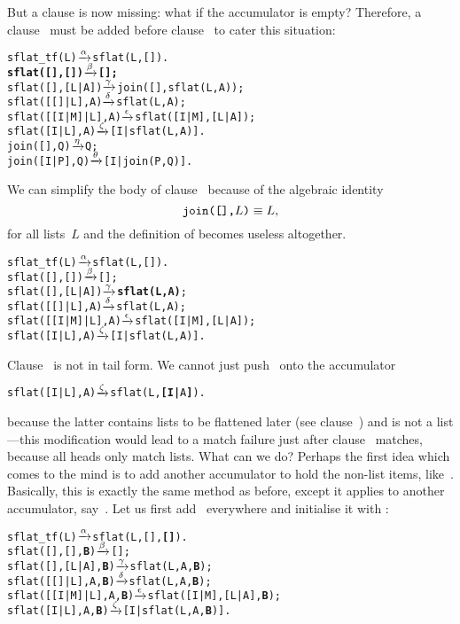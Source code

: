 But a clause is now missing: what if the accumulator is empty?
Therefore, a clause~\clause{\beta} must be added before
clause~\clause{\gamma} to cater this situation:
\begin{alltt}
sflat_tf(L)            \(\smashedrightarrow{\alpha}\) sflat(L,[]).
\textbf{sflat(       [],   []) \(\smashedrightarrow{\beta}\) [];}
sflat(       [],[L|A]) \(\smashedrightarrow{\gamma}\) join([],sflat(L,A));
sflat(   [[]|L],    A) \(\smashedrightarrow{\delta}\) sflat(L,A);
sflat([[I|M]|L],    A) \(\smashedrightarrow{\epsilon}\) sflat([I|M],[L|A]);
sflat(    [I|L],    A) \(\smashedrightarrow{\zeta}\) [I|sflat(L,A)].
join(   [],Q)          \(\smashedrightarrow{\eta}\) Q;
join([I|P],Q)          \(\smashedrightarrow{\theta}\) [I|join(P,Q)].
\end{alltt}
We can simplify the body of clause~\clause{\gamma} because of the
algebraic identity
\[
  \texttt{join([],\(L\))} \mathrel{\equiv} L,
\]
for all lists~\(L\) and the definition of  becomes
useless altogether.
\begin{alltt}
sflat_tf(L)            \(\smashedrightarrow{\alpha}\) sflat(L,[]).
sflat(       [],   []) \(\smashedrightarrow{\beta}\) [];
sflat(       [],[L|A]) \(\smashedrightarrow{\gamma}\) \textbf{sflat(L,A)};\hfill% \emph{Simplified}
sflat(   [[]|L],    A) \(\smashedrightarrow{\delta}\) sflat(L,A);
sflat([[I|M]|L],    A) \(\smashedrightarrow{\epsilon}\) sflat([I|M],[L|A]);
sflat(    [I|L],    A) \(\smashedrightarrow{\zeta}\) [I|sflat(L,A)].
\end{alltt}
Clause~\clause{\zeta} is not in tail form. We cannot just
push~ onto the accumulator
\begin{alltt}
sflat(    [I|L],    A) \(\smashedrightarrow{\zeta}\) sflat(L,\textbf{[I|}A\textbf{]}).\hfill% \emph{Wrong}
\end{alltt}
because the latter contains lists to be flattened later (see
clause~\clause{\epsilon}) and  is not a list---this
modification would lead to a match failure just after
clause~\clause{\gamma} matches, because all heads only match
lists. What can we do? Perhaps the first idea which comes to the mind
is to add another accumulator to hold the non\hyp{}list items,
like~. Basically, this is exactly the same method as
before, except it applies to another accumulator, say~. Let
us first add~ everywhere and initialise it with
\erlcode{[]}:
\begin{alltt}
sflat_tf(L)              \(\smashedrightarrow{\alpha}\) sflat(L,[],\textbf{[]}).
sflat(       [],   [],\textbf{B}) \(\smashedrightarrow{\beta}\) [];\hfill% B \emph{unused yet}
sflat(       [],[L|A],\textbf{B}) \(\smashedrightarrow{\gamma}\) sflat(L,A,\textbf{B});
sflat(   [[]|L],    A,\textbf{B}) \(\smashedrightarrow{\delta}\) sflat(L,A,\textbf{B});
sflat([[I|M]|L],    A,\textbf{B}) \(\smashedrightarrow{\epsilon}\) sflat([I|M],[L|A],\textbf{B});
sflat(    [I|L],    A,\textbf{B}) \(\smashedrightarrow{\zeta}\) [I|sflat(L,A,\textbf{B})].
\end{alltt}
